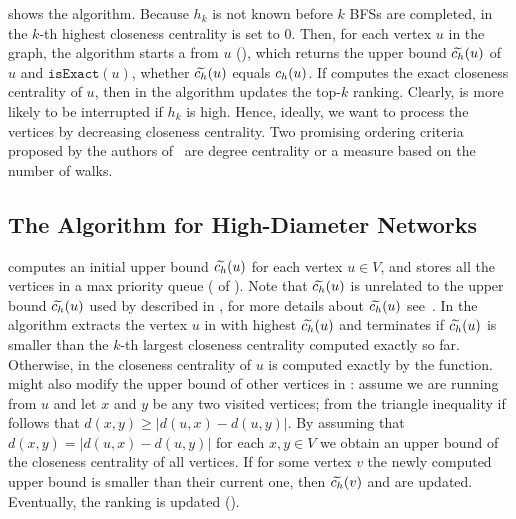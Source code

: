  shows the \nbcut algorithm. Because $h_k$ is not known before
$k$ BFSs are completed, in  the $k$-th highest
closeness centrality is set to 0. Then, for each vertex $u$ in the graph, the
algorithm starts a \bfscut from $u$ (), which returns
the upper bound $\widetilde{c_h}(u)$ of $u$ and $\texttt{isExact}(u)$, \ie whether
$\widetilde{c_h}(u)$ equals $c_h(u)$. If \bfscut computes the exact closeness
centrality of $u$, then in
 the algorithm
updates the top-$k$ ranking.
Clearly, \bfscut is more likely to be interrupted if $h_k$ is high.
Hence, ideally, we want to process the vertices by decreasing closeness
centrality. Two promising ordering criteria proposed by the authors
of~\cite{DBLP:journals/tkdd/BergaminiBCMM19} are degree centrality or a measure
based on the number of walks.



\subsection{The \nbbound Algorithm for High-Diameter Networks}
\label{sec:topk-clos-nbbound}
%
\nbbound computes an initial upper bound $\widetilde{c_h}(u)$ for each vertex $u\in V$,
and stores all the vertices in a max priority queue \prioq
( of
). Note that $\widetilde{c_h}(u)$ is unrelated to the upper bound
$\widetilde{c_h}(u)$ used by \nbcut described in , for more details
about $\widetilde{c_h}(u)$ see~\cite{DBLP:journals/tkdd/BergaminiBCMM19}.
In  the algorithm
extracts the vertex $u$ in \prioq with highest $\widetilde{c_h}(u)$ and terminates
if $\widetilde{c_h}(u)$ is smaller than the $k$-th largest closeness centrality computed
exactly so far.
%
Otherwise, in 
the closeness centrality of $u$ is computed exactly by the \bfsbound
function. \bfsbound might also modify the upper bound of other vertices
in \prioq: assume we are running \bfsbound from $u$ and let $x$ and $y$ be any two
visited vertices; from the triangle inequality if follows that
$d(x, y) \ge |d(u, x) - d(u, y)|$. By assuming that $d(x, y) = |d(u, x) - d(u,
y)|$ for each $x, y \in V$ we obtain an upper bound of the closeness centrality
of all vertices.
If for some vertex $v$ the newly computed upper bound is smaller than their current
one, then $\widetilde{c_h}(v)$ and \prioq are updated.
Eventually, the \topk ranking is updated
().

